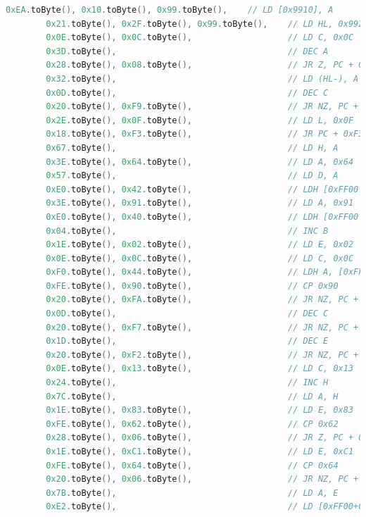 \begin{lstlisting}[language=Kotlin, caption={Secuencia de arranque y logo de Nintendo}, label={code:kotlinboot}]
        0xEA.toByte(), 0x10.toByte(), 0x99.toByte(),    // LD [0x9910], A
        0x21.toByte(), 0x2F.toByte(), 0x99.toByte(),    // LD HL, 0x992F
        0x0E.toByte(), 0x0C.toByte(),                   // LD C, 0x0C
        0x3D.toByte(),                                  // DEC A
        0x28.toByte(), 0x08.toByte(),                   // JR Z, PC + 0x08
        0x32.toByte(),                                  // LD (HL-), A
        0x0D.toByte(),                                  // DEC C
        0x20.toByte(), 0xF9.toByte(),                   // JR NZ, PC + 0xF9
        0x2E.toByte(), 0x0F.toByte(),                   // LD L, 0x0F
        0x18.toByte(), 0xF3.toByte(),                   // JR PC + 0xF3
        0x67.toByte(),                                  // LD H, A
        0x3E.toByte(), 0x64.toByte(),                   // LD A, 0x64
        0x57.toByte(),                                  // LD D, A
        0xE0.toByte(), 0x42.toByte(),                   // LDH [0xFF00 + 0x42], A
        0x3E.toByte(), 0x91.toByte(),                   // LD A, 0x91
        0xE0.toByte(), 0x40.toByte(),                   // LDH [0xFF00 + 0x40], A
        0x04.toByte(),                                  // INC B
        0x1E.toByte(), 0x02.toByte(),                   // LD E, 0x02
        0x0E.toByte(), 0x0C.toByte(),                   // LD C, 0x0C
        0xF0.toByte(), 0x44.toByte(),                   // LDH A, [0xFF00 + 0x44]
        0xFE.toByte(), 0x90.toByte(),                   // CP 0x90
        0x20.toByte(), 0xFA.toByte(),                   // JR NZ, PC + 0xFA
        0x0D.toByte(),                                  // DEC C
        0x20.toByte(), 0xF7.toByte(),                   // JR NZ, PC + 0xF7
        0x1D.toByte(),                                  // DEC E
        0x20.toByte(), 0xF2.toByte(),                   // JR NZ, PC + 0xF2
        0x0E.toByte(), 0x13.toByte(),                   // LD C, 0x13
        0x24.toByte(),                                  // INC H
        0x7C.toByte(),                                  // LD A, H
        0x1E.toByte(), 0x83.toByte(),                   // LD E, 0x83
        0xFE.toByte(), 0x62.toByte(),                   // CP 0x62
        0x28.toByte(), 0x06.toByte(),                   // JR Z, PC + 0x06
        0x1E.toByte(), 0xC1.toByte(),                   // LD E, 0xC1
        0xFE.toByte(), 0x64.toByte(),                   // CP 0x64
        0x20.toByte(), 0x06.toByte(),                   // JR NZ, PC + 0x06
        0x7B.toByte(),                                  // LD A, E
        0xE2.toByte(),                                  // LD [0xFF00+C], A

\end{lstlisting}
